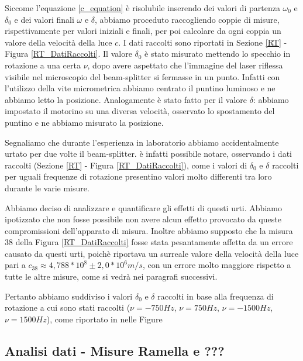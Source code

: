 \documentclass{article}
\begin{document}
Siccome l'equazione \ref{c_equation} è risolubile inserendo dei valori di partenza $\omega_0$ e $\delta_0$ e dei valori finali $\omega$ e $\delta$, abbiamo proceduto
raccogliendo coppie di misure, rispettivamente per valori iniziali e finali, per poi calcolare da ogni coppia un valore della velocità della luce $c$. I dati raccolti
sono riportati in Sezione \ref{RT} - Figura \ref{RT_DatiRaccolti}.
Il valore $\delta_0$ è stato misurato mettendo lo specchio in rotazione a una certa $\nu$, dopo avere aspettato che l'immagine del laser riflessa visibile nel microscopio
del beam-splitter si fermasse in un punto. Infatti con l'utilizzo della vite micrometrica abbiamo centrato il puntino luminoso e ne abbiamo letto la posizione.
Analogamente è stato fatto per il valore $\delta$: abbiamo impostato il motorino su una diversa velocità, osservato lo spostamento del puntino e ne abbiamo misurato la
posizione.

Segnaliamo che durante l'esperienza in laboratorio abbiamo accidentalmente urtato per due volte il beam-splitter. è infatti possibile notare, osservando i dati raccolti 
(Sezione \ref{RT} - Figura \ref{RT_DatiRaccolti}), come i valori di $\delta_0$ e $\delta$ raccolti per uguali frequenze di rotazione presentino valori molto differenti 
tra loro durante le varie misure.

Abbiamo deciso di analizzare e quantificare gli effetti di questi urti. Abbiamo ipotizzato che non fosse possibile non avere alcun effetto provocato da queste compromissioni
dell'apparato di misura. Inoltre abbiamo supposto che la misura 38 della Figura \ref{RT_DatiRaccolti} fosse stata pesantamente affetta da un errore causato da questi urti,
poichè riportava un surreale valore della velocità della luce pari a $c_{38}\approx 4,788 *10^8 \pm 2,0 *10^6 m/s$, con un errore molto maggiore rispetto a tutte le altre misure,
come si vedrà nei paragrafi successivi. 

Pertanto abbiamo suddiviso i valori $\delta_0$ e $\delta$ raccolti in base alla frequenza di rotazione a cui sono stati raccolti ($\nu=-750Hz$, $\nu=750Hz$, 
$\nu=-1500Hz$, $\nu=1500Hz$), come riportato in nelle Figure 











\subsection{Analisi dati - Misure Ramella e ???}
\end{document}
